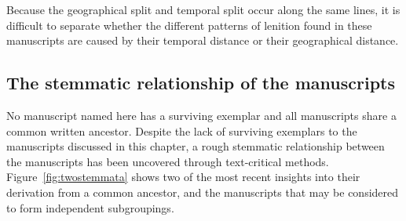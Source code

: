 Because the geographical split and temporal split occur along the same lines, it is difficult to separate whether the different patterns of lenition found in these manuscripts are caused by their temporal distance or their geographical distance.

\subsection{The stemmatic relationship of the manuscripts}
\label{sec:stemmata}
No manuscript named here has a surviving exemplar and all manuscripts share a common written ancestor. Despite the lack of surviving exemplars to the manuscripts discussed in this chapter, a rough stemmatic relationship between the manuscripts has been uncovered through text-critical methods. Figure~\ref{fig:twostemmata} shows two of the most recent insights into their derivation from a common ancestor, and the manuscripts that may be considered to form independent subgroupings.

